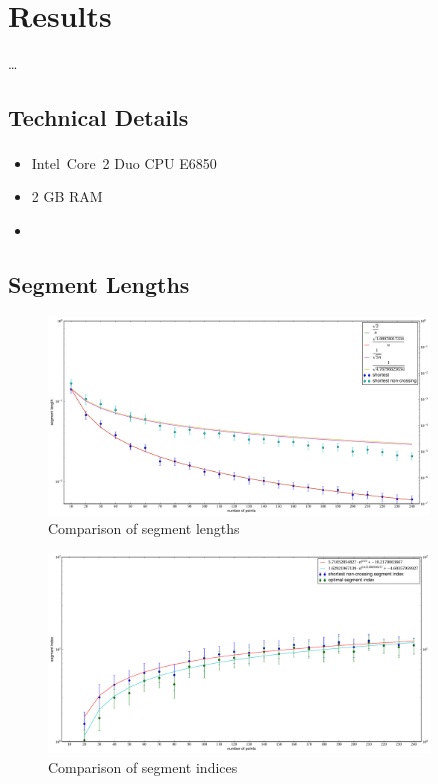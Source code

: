 \chapter{Results}
\ldots{}

\section{Technical Details}
\begin{itemize}
  \item Intel\textsuperscript{\textregistered}~Core\texttrademark~2 Duo CPU E6850
  \item 2 GB RAM
  \item {}
\end{itemize}

\section{Segment Lengths}

\begin{figure}[ht]
  \centering
  \includegraphics[width=0.9\textwidth]{results/shortest_length.pdf}
  \caption{Comparison of segment lengths\label{fig:segment_lengths}}
\end{figure}

\begin{figure}[ht]
  \centering
  \includegraphics[width=0.9\textwidth]{results/shortest_index.pdf}
  \caption{Comparison of segment indices\label{fig:segment_index}}
\end{figure}

